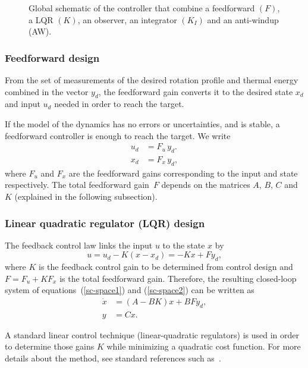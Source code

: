 \documentclass[12pt,lot, lof]{puthesis}
\begin{document}
\begin{figure}
\caption{Global schematic of the controller that combine a feedforward $(F)$, a LQR $(K)$, an observer, an integrator $(K_I)$ and an anti-windup (AW).}
\label{fig:model1}
\end{figure}

\subsubsection{Feedforward design} 
From the set of measurements of the desired rotation profile and thermal energy combined in the vector $y_d$, the feedforward gain converts it to the desired state $x_d$ and input $u_d$ needed in order to reach the target.

If the model of the dynamics has no errors or uncertainties, and is stable, a feedforward controller is enough to reach the target. We write
\begin{align}
   u_d &= F_u  \, y_d. \\
   x_d &= F_x  \,  y_d, 
\end{align}
where $ F_u$ and $ F_x $ are the feedforward gains corresponding  to the input and state respectively.
The total feedforward gain~$F$  depends on the matrices $A$, $B$, $C$ and $K$ (explained in the following subsection).
    
\subsubsection{Linear quadratic regulator (LQR) design} 

The feedback control law links the input $u$ to the state $x$ by
\begin{equation}
   u = u_{d} - K(x - x_{d}) = - Kx + Fy_{d},
   \label{eqn:ctrllaw_ff}
\end{equation}
where $K$ is the feedback control gain to be determined from control design and $F = F_u + K F_x$ is the total feedforward gain.  Therefore, the resulting closed-loop system of equations~(\ref{sc-space1}) and (\ref{sc-space2}) can be written as
\begin{equation}
\begin{aligned}
      \dot{x} &= (A-BK) x + BF y_{d}, \\
      y &= C x.
\end{aligned}\label{eq:4}
\end{equation}

A  standard linear control technique (linear-quadratic regulators) is used in order to determine those gains $K$ while minimizing a quadratic cost function.
For more details about the method, see standard references such as~\cite{SandP, AandM}.
\end{document}
